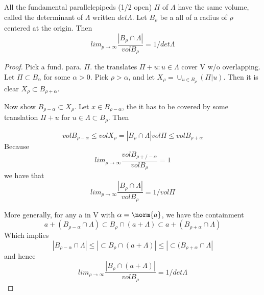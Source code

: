 \begin{theorem}
\label{detVolumeLimit}
	All the fundamental parallelepipeds (1/2 open) $\Pi$ of $\Lambda$ have the same volume, called the determinant of $\Lambda$ written $det \Lambda$. Let $B_\rho$ be a all of a radius of $\rho$ centered at the origin. Then
\begin{displaymath}
	lim_{p \to \infty} \frac{|B_\rho \cap \Lambda|}{vol B_\rho} = 1/det \Lambda
\end{displaymath}
\end{theorem}

\begin{proof}
Pick a fund. para. $\Pi$. the translates $\Pi + u: u\in \Lambda$ cover V w/o overlapping. Let $\Pi \subset B_\alpha$ for some $\alpha > 0$. Pick $\rho > \alpha$, and let $X_\rho = \cup_{u \in B_\rho} (\Pi | u)$. Then it is clear $X_\rho \subset B_{\rho + \alpha}$. 

Now show $B_{\rho - \alpha} \subset X_\rho $. Let $x \in B_{\rho - \alpha}$, the it has to be covered by some translation $\Pi + u$ for $u\in \Lambda \subset B_\rho$. Then

\begin{displaymath}
	vol B_{\rho - \alpha} \leq vol X_\rho = | B_\rho \cap \Lambda| vol \Pi \leq vol B_{\rho + \alpha}
\end{displaymath}
Because 
\begin{displaymath}
	lim_{\rho \to \infty} \frac{vol B_{\rho +/- \alpha}}{vol B_\rho} = 1
\end{displaymath}
we have that 
\begin{displaymath}
	lim_{p \to \infty} \frac{|B_\rho \cap \Lambda|}{vol B_\rho} = 1/vol \Pi
\end{displaymath}

More generally, for any a in V with $\alpha = \norm{a}$, we have the containment
\begin{displaymath}
	a + (B_{\rho - \alpha} \cap \Lambda) \subset B_\rho \cap (a + \Lambda) \subset a + (B_{\rho + \alpha} \cap \Lambda)
\end{displaymath}
Which implies 
\begin{displaymath}
	|B_{\rho - \alpha} \cap \Lambda| \leq |\subset B_\rho \cap (a + \Lambda) | \leq |\subset(B_{\rho + \alpha} \cap \Lambda|
\end{displaymath}
and hence 
\begin{displaymath}
	lim_{\rho \to \infty} \frac{|B_{\rho} \cap (a+\Lambda) |}{vol B_\rho} = 1/det \Lambda
\end{displaymath}
\end{proof}


